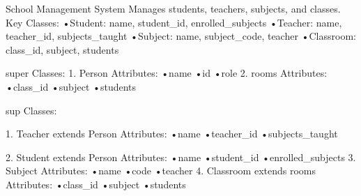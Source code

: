 School Management System
    Manages students, teachers, subjects, and classes.
        Key Classes:
            •Student: name, student_id, enrolled_subjects
            •Teacher: name, teacher_id, subjects_taught
            •Subject: name, subject_code, teacher
            •Classroom: class_id, subject, students

super Classes:
1. Person
    Attributes:
        •name
        •id
        •role
2. rooms
    Attributes:
        •class_id
        •subject
        •students

sup Classes:

1. Teacher extends Person
    Attributes:
        •name
        •teacher_id
        •subjects_taught

2. Student extends Person
    Attributes:
        •name
        •student_id
        •enrolled_subjects
3. Subject 
    Attributes:
        •name
        •code
        •teacher
4. Classroom extends rooms
    Attributes:
        •class_id
        •subject
        •students
